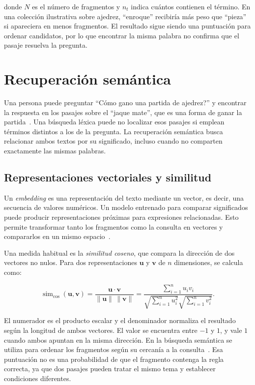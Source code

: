 donde $N$ es el número de fragmentos y $n_t$ indica cuántos contienen el término. En una colección ilustrativa sobre ajedrez, \enquote{enroque} recibiría más peso que \enquote{pieza} si apareciera en menos fragmentos. El resultado sigue siendo una puntuación para ordenar candidatos, por lo que encontrar la misma palabra no confirma que el pasaje resuelva la pregunta.

\section{Recuperación semántica}

Una persona puede preguntar \enquote{\textquestiondown{}Cómo gano una partida de
ajedrez?} y encontrar la respuesta en los pasajes sobre el \enquote{jaque mate},
que es una forma de ganar la partida~\cite{fide2023ajedrez}. Una búsqueda léxica puede no localizar esos pasajes
si emplean términos distintos a los de la pregunta. La recuperación semántica
busca relacionar ambos textos por su significado, incluso cuando no comparten
exactamente las mismas palabras.

\subsection{Representaciones vectoriales y similitud}

Un \textit{embedding} es una representación del texto mediante un
vector, es decir, una secuencia de valores numéricos. Un modelo
entrenado para comparar significados puede producir
representaciones próximas para expresiones relacionadas. Esto
permite transformar tanto los fragmentos como la consulta en
vectores y compararlos en un mismo
espacio~\cite{reimers2019sentence}.

Una medida habitual es la \textit{similitud coseno}, que compara la dirección de dos vectores no nulos. Para dos representaciones $\mathbf{u}$ y $\mathbf{v}$ de $n$ dimensiones, se calcula como:

\begin{equation}
    \operatorname{sim}_{\cos}(\mathbf{u},\mathbf{v}) =
    \frac{\mathbf{u}\cdot\mathbf{v}}{\|\mathbf{u}\|\,\|\mathbf{v}\|}
    = \frac{\sum_{i=1}^{n}u_i v_i}
    {\sqrt{\sum_{i=1}^{n}u_i^2}\sqrt{\sum_{i=1}^{n}v_i^2}}.
    \label{eq:teoria-coseno}
\end{equation}

El numerador es el producto escalar y el denominador normaliza el
resultado según la longitud de ambos vectores. El valor se
encuentra entre $-1$ y $1$, y vale $1$ cuando ambos apuntan en la
misma dirección. En la búsqueda semántica se utiliza para ordenar
los fragmentos según su cercanía a la
consulta~\cite{reimers2019sentence}. Esa puntuación no es una
probabilidad de que el fragmento contenga la regla correcta, ya que
dos pasajes pueden tratar el mismo tema y establecer condiciones
diferentes.

